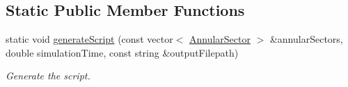\subsection*{Static Public Member Functions}
\begin{DoxyCompactItemize}
\item 
static void \hyperlink{classmultiscale_1_1video_1_1PolarGnuplotScriptGenerator_a9e60fa7dd9c47dc89cdce30a39175a6e}{generate\-Script} (const vector$<$ \hyperlink{classmultiscale_1_1video_1_1AnnularSector}{Annular\-Sector} $>$ \&annular\-Sectors, double simulation\-Time, const string \&output\-Filepath)
\begin{DoxyCompactList}\small\item\em Generate the script. \end{DoxyCompactList}\end{DoxyCompactItemize}
